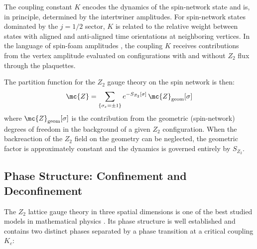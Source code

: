 The coupling constant $ K $ encodes the dynamics of the spin-network state and is, in principle, determined by the intertwiner amplitudes. For spin-network states dominated by the $ j = 1/2 $ sector, $ K $ is related to the relative weight between states with aligned and anti-aligned time orientations at neighboring vertices. In the language of spin-foam amplitudes \cite{Perez2013The-Spin-Foam,Dona2020Numerical,Dona2022Asymptotics}, the coupling $ K $ receives contributions from the vertex amplitude evaluated on configurations with and without $ Z_2 $ flux through the plaquettes.

The partition function for the $ Z_2 $ gauge theory on the spin network is then:
\begin{equation}\label{eqn:z2-partition-function}
	\mc{Z} = \sum_{\{\sigma_e = \pm 1\}} e^{-S_{Z_2}[\sigma]} \, \mc{Z}_{\text{geom}}[\sigma]
\end{equation}
where $ \mc{Z}_{\text{geom}}[\sigma] $ is the contribution from the geometric (spin-network) degrees of freedom in the background of a given $ Z_2 $ configuration. When the backreaction of the $ Z_2 $ field on the geometry can be neglected, the geometric factor is approximately constant and the dynamics is governed entirely by $ S_{Z_2} $.

\subsection{Phase Structure: Confinement and Deconfinement}\label{subsec:z2-phases}

The $ Z_2 $ lattice gauge theory in three spatial dimensions is one of the best studied models in mathematical physics \cite{Wegner1971Duality,Kogut1979An-introduction,Fradkin1979Phase}. Its phase structure is well established and contains two distinct phases separated by a phase transition at a critical coupling $ K_c $:

